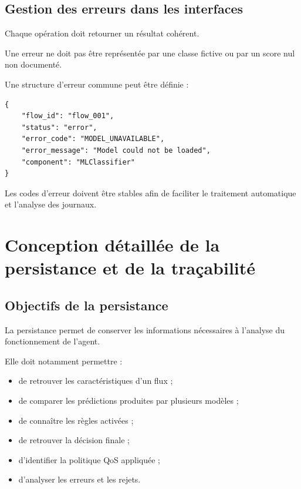 \subsection{Gestion des erreurs dans les interfaces}

Chaque opération doit retourner un résultat cohérent.

Une erreur ne doit pas être représentée par une classe fictive ou par un score nul non documenté.

Une structure d'erreur commune peut être définie :

\begin{verbatim}
{
    "flow_id": "flow_001",
    "status": "error",
    "error_code": "MODEL_UNAVAILABLE",
    "error_message": "Model could not be loaded",
    "component": "MLClassifier"
}
\end{verbatim}

Les codes d'erreur doivent être stables afin de faciliter le traitement automatique et l'analyse des journaux.

\section{Conception détaillée de la persistance et de la traçabilité}

\subsection{Objectifs de la persistance}

La persistance permet de conserver les informations nécessaires à l'analyse du fonctionnement de l'agent.

Elle doit notamment permettre :

\begin{itemize}
    \item de retrouver les caractéristiques d'un flux ;
    \item de comparer les prédictions produites par plusieurs modèles ;
    \item de connaître les règles activées ;
    \item de retrouver la décision finale ;
    \item d'identifier la politique QoS appliquée ;
    \item d'analyser les erreurs et les rejets.
\end{itemize}

